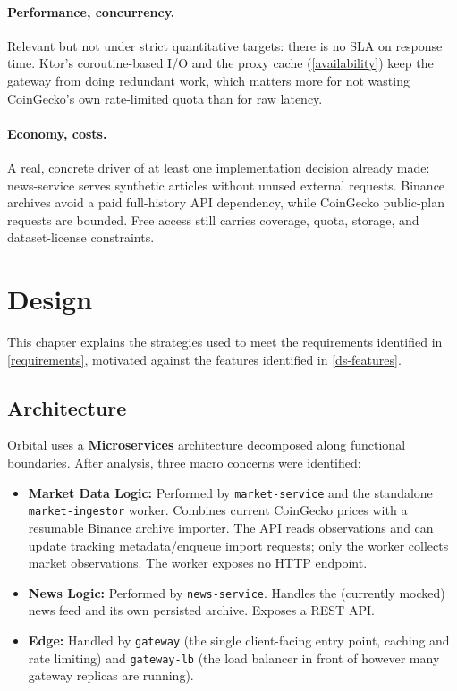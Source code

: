 \documentclass{scrartcl}
\begin{document}
\paragraph{Performance, concurrency.} Relevant but not under strict quantitative targets: there
is no SLA on response time. Ktor's coroutine-based I/O and the proxy cache (\cref{availability})
keep the gateway from doing redundant work, which matters more for not wasting CoinGecko's own
rate-limited quota than for raw latency.

\paragraph{Economy, costs.} A real, concrete driver of at least one implementation decision
already made: news-service serves synthetic articles without unused external requests. Binance
archives avoid a paid full-history API dependency, while CoinGecko public-plan requests are
bounded. Free access still carries coverage, quota, storage, and dataset-license constraints.

\section{Design}\label{design}

This chapter explains the strategies used to meet the requirements identified in
\cref{requirements}, motivated against the features identified in \cref{ds-features}.

\subsection{Architecture}\label{architecture}

Orbital uses a \textbf{Microservices} architecture decomposed along functional boundaries. After
analysis, three macro concerns were identified:

\begin{itemize}
  \item \textbf{Market Data Logic:} Performed by \texttt{market-service} and the standalone
  \texttt{market-ingestor} worker. Combines current CoinGecko prices with a resumable Binance
  archive importer. The API reads observations and can update tracking metadata/enqueue import
  requests; only the worker collects market observations. The worker exposes no HTTP endpoint.
  \item \textbf{News Logic:} Performed by \texttt{news-service}. Handles the (currently mocked)
  news feed and its own persisted archive. Exposes a REST API.
  \item \textbf{Edge:} Handled by \texttt{gateway} (the single client-facing entry point, caching
  and rate limiting) and \texttt{gateway-lb} (the load balancer in front of however many gateway
  replicas are running).
\end{itemize}
\end{document}
